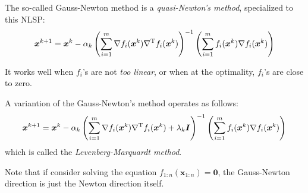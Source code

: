 The so-called Gauss-Newton method is a \emph{quasi-Newton's method}, specialized to this NLSP:
\[
\bm x^{k+1} = \bm x^k - \alpha_k
\left(
\sum_{i=1}^m\nabla f_i(\bm x^k)\nabla^{\mathrm T} f_i(\bm x^k) 
\right)^{-1}\left(
\sum_{i=1}^mf_i(\bm x^k)\nabla f_i(\bm x^k)\right)
\]
\begin{remark}
It works well when $f_i$'s are not \emph{too linear}, or when at the optimality, $f_i$'s are close to zero.
\end{remark}

A variantion of the Gauss-Newton's method operates as follows:
\[
\bm x^{k+1} = \bm x^k - \alpha_k
\left(
\sum_{i=1}^m\nabla f_i(\bm x^k)\nabla^{\mathrm T} f_i(\bm x^k) +\lambda_k\bm I
\right)^{-1}\left(
\sum_{i=1}^mf_i(\bm x^k)\nabla f_i(\bm x^k)\right)
\]
which is called the \emph{Levenberg-Marquardt method}.

Note that if consider solving the equation $f_{1:n}(\bm x_{1:n})=\bm0$, the Gauss-Newton direction is just the Newton direction itself.






















